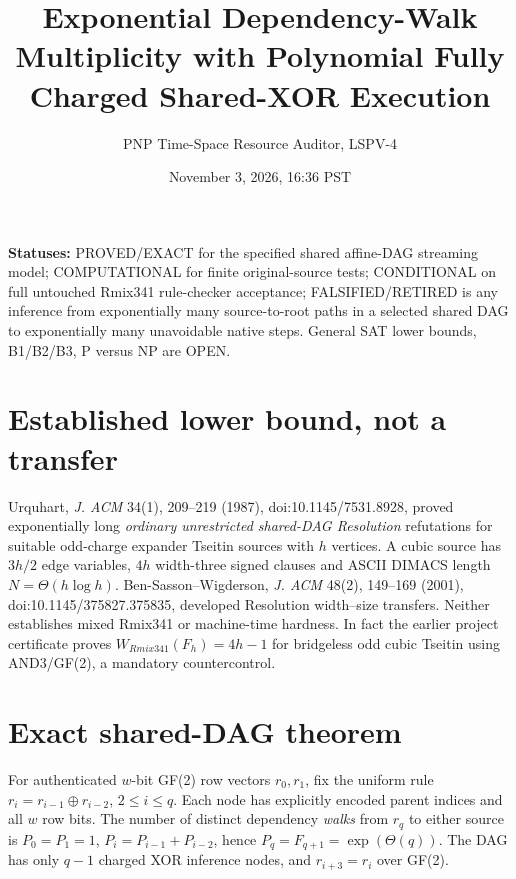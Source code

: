 \documentclass[11pt]{article}
\title{Exponential Dependency-Walk Multiplicity with Polynomial Fully Charged Shared-XOR Execution}
\author{PNP Time-Space Resource Auditor, LSPV-4}
\date{November 3, 2026, 16:36 PST}
\begin{document}
\maketitle

\noindent\textbf{Statuses:} PROVED/EXACT for the specified shared affine-DAG streaming model; COMPUTATIONAL for finite original-source tests; CONDITIONAL on full untouched Rmix341 rule-checker acceptance; FALSIFIED/RETIRED is any inference from exponentially many source-to-root paths in a selected shared DAG to exponentially many unavoidable native steps. General SAT lower bounds, B1/B2/B3, P versus NP are OPEN.

\section*{Established lower bound, not a transfer}
Urquhart, \emph{J. ACM} 34(1), 209--219 (1987), doi:10.1145/7531.8928, proved exponentially long \emph{ordinary unrestricted shared-DAG Resolution} refutations for suitable odd-charge expander Tseitin sources with $h$ vertices. A cubic source has $3h/2$ edge variables, $4h$ width-three signed clauses and ASCII DIMACS length $N=\Theta(h\log h)$. Ben-Sasson--Wigderson, \emph{J. ACM} 48(2), 149--169 (2001), doi:10.1145/375827.375835, developed Resolution width--size transfers. Neither establishes mixed Rmix341 or machine-time hardness. In fact the earlier project certificate proves $W_{Rmix341}(F_h)=4h-1$ for bridgeless odd cubic Tseitin using AND3/GF(2), a mandatory countercontrol.

\section*{Exact shared-DAG theorem}
For authenticated $w$-bit GF(2) row vectors $r_0,r_1$, fix the uniform rule $r_i=r_{i-1}\oplus r_{i-2}$, $2\le i\le q$. Each node has explicitly encoded parent indices and all $w$ row bits. The number of distinct dependency \emph{walks} from $r_q$ to either source is $P_0=P_1=1$, $P_i=P_{i-1}+P_{i-2}$, hence $P_q=F_{q+1}=\exp(\Theta(q))$. The DAG has only $q-1$ charged XOR inference nodes, and $r_{i+3}=r_i$ over GF(2).
\end{document}
